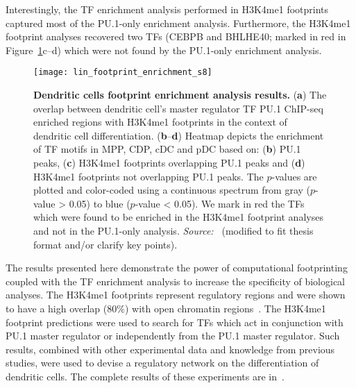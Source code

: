Interestingly, the TF enrichment analysis performed in H3K4me1 footprints captured most of the PU.1-only enrichment analysis. Furthermore, the H3K4me1 footprint analyses recovered two TFs (CEBPB and BHLHE40; marked in red in Figure~\ref{fig:lin_footprint_enrichment_s8}c--d) which were not found by the PU.1-only enrichment analysis.

\begin{figure}[h!]
\centering
\texttt{[image: lin\_footprint\_enrichment\_s8]}
\caption[Dendritic cells footprint enrichment analysis results]{\textbf{Dendritic cells footprint enrichment analysis results.} (\textbf{a}) The overlap between dendritic cell's master regulator TF PU.1 ChIP-seq enriched regions with H3K4me1 footprints in the context of dendritic cell differentiation. (\textbf{b}--\textbf{d}) Heatmap depicts the enrichment of TF motifs in MPP, CDP, cDC and pDC based on: (\textbf{b}) PU.1 peaks, (\textbf{c}) H3K4me1 footprints overlapping PU.1 peaks and (\textbf{d}) H3K4me1 footprints not overlapping PU.1 peaks. The $p$-values are plotted and color-coded using a continuous spectrum from gray ($p$-value > 0.05) to blue ($p$-value < 0.05). We mark in red the TFs which were found to be enriched in the H3K4me1 footprint analyses and not in the PU.1-only analysis. \emph{Source:~\cite{lin2015}} (modified to fit thesis format and/or clarify key points).}
\label{fig:lin_footprint_enrichment_s8}
\end{figure}

The results presented here demonstrate the power of computational footprinting coupled with the TF enrichment analysis to increase the specificity of biological analyses. The H3K4me1 footprints represent regulatory regions and were shown to have a high overlap (\approxy$80\%$) with open chromatin regions~\citep{lin2015}. The H3K4me1 footprint predictions were used to search for TFs which act in conjunction with PU.1 master regulator or independently from the PU.1 master regulator. Such results, combined with other experimental data and knowledge from previous studies, were used to devise a regulatory network on the differentiation of dendritic cells. The complete results of these experiments are in~\cite{lin2015}.

